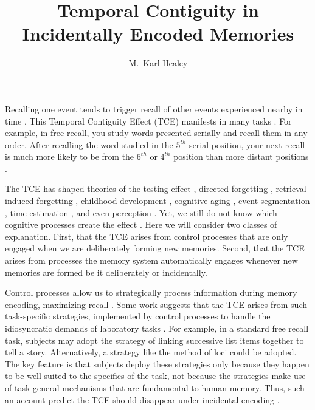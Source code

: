 \documentclass[jou,natbib,floatsintext]{apa6} %
\title{Temporal Contiguity in Incidentally Encoded Memories}
\author{M.\ Karl Healey}
\affiliation{Michigan State University}
\begin{document}
\maketitle





Recalling one event tends to trigger recall of other events experienced nearby in time \citep{HealKaha17}. This Temporal Contiguity Effect (TCE) manifests in many tasks \citep{DaviEtal08,SchwEtal05}. For example, in free recall, you study words presented serially and recall them in any order. After recalling the word studied in the $5^{th}$ serial position, your next recall is much more likely to be from the $6^{th}$ or $4^{th}$ position than more distant positions \citep{Kaha96}. 

The TCE has shaped theories of the testing effect \citep{KarpEtal14}, directed forgetting \citep{SahaEtal13}, retrieval induced forgetting \citep{KlieBaum16}, childhood development \citep{JarroEtal15}, cognitive aging \citep{WahlHuff15,HealKaha15}, event segmentation \citep{EzzyDava14}, time estimation \citep{SahaSmit13}, and even perception \citep{TurkEtal12}. Yet, we still do not know which cognitive processes create the effect \citep{HealKaha17}. Here we will consider two classes of explanation. First, that the TCE arises from control processes that are only engaged when we are deliberately forming new memories. Second, that the TCE arises from processes the memory system automatically engages whenever new memories are formed be it deliberately or incidentally.   


Control processes \citep{LehmMalm13,RaaiShif81} allow us to strategically process information during memory encoding, maximizing recall \citep[e.g.,][]{Unsw16}. Some work suggests that the TCE arises from such task-specific strategies, implemented by control processes to handle the idiosyncratic demands of laboratory tasks \citep{Hint16}. For example, in a standard free recall task, subjects may adopt the strategy of linking successive list items together to tell a story. Alternatively, a strategy like the method of loci could be adopted. The key feature is that subjects deploy these strategies only because they happen to be well-suited to the specifics of the task, not because the strategies make use of task-general mechanisms that are fundamental to human memory. Thus, such an account predict the TCE should disappear under incidental encoding \citep{Hint16}.
\end{document}
